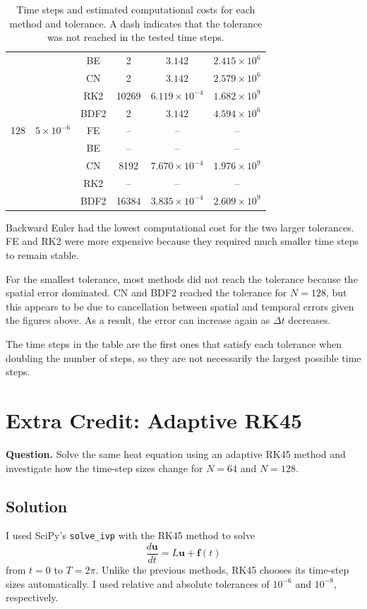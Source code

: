 \documentclass[11pt]{article}
\begin{document}
\begin{table}[H]
\begin{tabular}{cccccc}
    &           & BE   & 2     & $3.142$              & $2.415\times10^6$ \\
    &           & CN   & 2     & $3.142$              & $2.579\times10^6$ \\
    &           & RK2  & 10269 & $6.119\times10^{-4}$ & $1.682\times10^9$ \\
    &           & BDF2 & 2     & $3.142$              & $4.594\times10^6$ \\
\midrule
128 & $5\times10^{-6}$ & FE   & --    & --                    & -- \\
    &                   & BE   & --    & --                    & -- \\
    &                   & CN   & 8192  & $7.670\times10^{-4}$ & $1.976\times10^9$ \\
    &                   & RK2  & --    & --                    & -- \\
    &                   & BDF2 & 16384 & $3.835\times10^{-4}$ & $2.609\times10^9$ \\
\bottomrule
\end{tabular}
\caption{Time steps and estimated computational costs for each method and tolerance. A dash indicates that the tolerance was not reached in the tested time steps.}
\end{table}

Backward Euler had the lowest computational cost for the two larger tolerances. FE and RK2 were more expensive because they required much smaller time steps to remain stable.

For the smallest tolerance, most methods did not reach the tolerance because the spatial error dominated. CN and BDF2 reached the tolerance for $N=128$, but this appears to be due to cancellation between spatial and temporal errors given the figures above. As a result, the error can increase again as $\Delta t$ decreases.

The time steps in the table are the first ones that satisfy each tolerance when doubling the number of steps, so they are not necessarily the largest possible time steps.

\newpage
\section*{Extra Credit: Adaptive RK45}
\textbf{Question.} Solve the same heat equation using an adaptive RK45 method and investigate how the time-step sizes change for $N=64$ and $N=128$.

\subsection*{Solution}
I used SciPy's \texttt{solve\_ivp} with the RK45 method to solve
\[
 \frac{d\mathbf{u}}{dt}=L\mathbf{u}+\mathbf{f}(t)
\]
from $t=0$ to $T=2\pi$. Unlike the previous methods, RK45 chooses its time-step sizes automatically. I used relative and absolute tolerances of $10^{-6}$ and $10^{-8}$, respectively.
\end{document}
